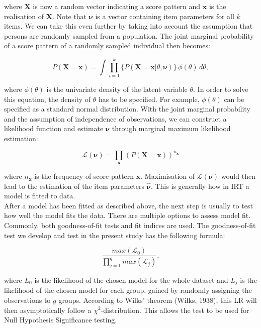 \documentclass[Royal,sageapa,times,doublespace]{sagej}
\begin{document}
where $\boldsymbol{X}$ is now a random vector indicating a score pattern and $\boldsymbol{x}$ is the realisation of $\boldsymbol{X}$. Note that $\boldsymbol{\nu}$ is a vector containing item parameters for all $k$ items. We can take this even further by taking into account the assumption that persons are randomly sampled from a population. The joint marginal probability of a score pattern of a randomly sampled individual then becomes:

\begin{equation}
P(\boldsymbol{X} = \boldsymbol{x}) = \int \prod_{i=1}^{k} \{ P(\boldsymbol{X} = \boldsymbol{x} | \theta, \boldsymbol{\nu}) \} \,\phi(\theta)\,d\theta,
\end{equation}

where $\phi(\theta)$ is the univariate density of the latent variable $\theta$. In order to solve this equation, the density of $\theta$ has to be specified. For example, $\phi(\theta)$ can be specified as a standard normal distribution. With the joint marginal probability and the assumption of independence of observations, we can construct a likelihood function and estimate $\boldsymbol{\nu}$ through marginal maximum likelihood estimation:

\begin{equation}
\mathcal{L}(\boldsymbol{\nu}) = \prod_{\boldsymbol{x}} (P(\boldsymbol{X} = \boldsymbol{x}))^{n_{\boldsymbol{x}}}
\end{equation}

where $n_{\boldsymbol{x}}$ is the frequency of score pattern $\boldsymbol{x}$. Maximisation of $\mathcal{L}(\boldsymbol{\nu})$ would then lead to the estimation of the item parameters $\boldsymbol{\hat{\nu}}$. This is generally how in IRT a model is fitted to data. \\
\indent After a model has been fitted as described above, the next step is usually to test how well the model fits the data. There are multiple options to assess model fit. Commonly, both goodness-of-fit tests and fit indices are used. The goodness-of-fit test we develop and test in the present study has the following formula: 

\begin{equation}
\frac{max(\mathcal{L}_0)}{\prod_{j = 1}^g max(\mathcal{L}_j)},
\end{equation}

where $L_0$ is the likelihood of the chosen model for the whole dataset and $L_j$ is the likelihood of the chosen model for each group, gained by randomly assigning the observations to $g$ groups. According to Wilks' theorem (Wilks, 1938), this LR will then asymptotically follow a $\chi^2$-distribution. This allows the test to be used for Null Hypothesis Significance testing. 
\end{document}
